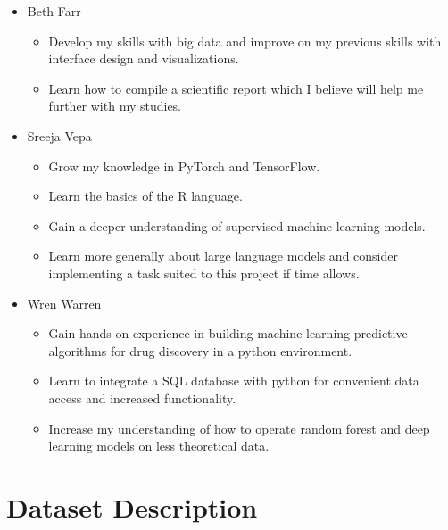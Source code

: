 \documentclass{report}
\begin{document}
\begin{itemize}
    \item Beth Farr
        \begin{itemize}
            \item Develop my skills with big data and improve on my previous skills with interface design and visualizations.
            \item Learn how to compile a scientific report which I believe will help me further with my studies.
        \end{itemize}
    \item Sreeja Vepa
       \begin{itemize}
            \item Grow my knowledge in PyTorch and TensorFlow. 
            \item Learn the basics of the R language.
            \item Gain a deeper understanding of supervised machine learning models.
            \item Learn more generally about large language models and consider implementing a task suited to this project if time allows.
        \end{itemize}
    \item Wren Warren
       \begin{itemize}
            \item Gain hands-on experience in building machine learning predictive algorithms for drug discovery in a python environment.
            \item Learn to integrate a SQL database with python for convenient data access and increased functionality.
            \item Increase my understanding of how to operate random forest and deep learning models on less theoretical data.
        \end{itemize}
\end{itemize}

\chapter{Dataset Description}
\end{document}
